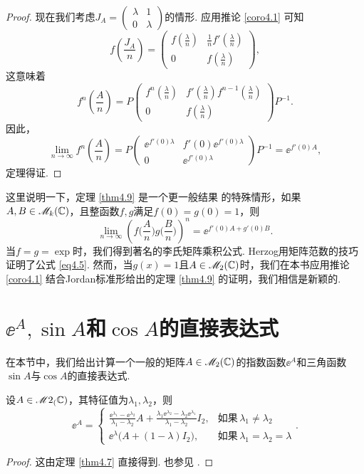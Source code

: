 \begin{proof}
  现在我们考虑$J_A=\begin{pmatrix}
    \lambda & 1 \\
    0 & \lambda
  \end{pmatrix}$的情形. 应用推论 \ref{coro4.1} 可知
  \[
    f\left(\frac{J_A}n\right) = \begin{pmatrix}
      f\left(\frac\lambda n\right) & \frac1nf'\left(\frac\lambda n\right) \\
      0 & f\left(\frac\lambda n\right)
    \end{pmatrix},
  \]
  这意味着
  \[
    f^n\left(\frac An\right) = P\begin{pmatrix}
      f^n\left(\frac\lambda n\right) & f'\left(\frac\lambda n\right) f^{n-1}\left(\frac\lambda n\right) \\
      0 & f\left(\frac\lambda n\right)
    \end{pmatrix}P^{-1}.
  \]
  因此，
  \[
    \lim_{n\to\infty}f^n\left(\frac An\right) = P\begin{pmatrix}
      \ee^{f'(0)\lambda} & f'(0)\ee^{f'(0)\lambda} \\
      0 & \ee^{f'(0)\lambda}
    \end{pmatrix}P^{-1} = \ee^{f'(0)A},
  \]
  定理得证.
\end{proof}

\begin{remark}
  这里说明一下，定理 \ref{thm4.9} 是一个更一般结果 \cite{37} 的特殊情形，如果$A,B\in\mathscr M_k(\mathbb C)$，且整函数$f,g$满足$f(0)=g(0)=1$，则
  \begin{equation}\label{eq4.5}
    \lim_{n\to\infty} \left( f\Big( \frac An\Big) g\Big(\frac Bn\Big) \right)^n = \ee^{f'(0)A+g'(0)B}.
  \end{equation}
  当$f=g=\exp$时，我们得到著名的{\kaishu 李氏矩阵乘积公式}. Herzog用矩阵范数的技巧证明了公式 \eqref{eq4.5}. 然而，当$g(x)=1$且$A\in\mathscr M_2(\mathbb C)$时，我们在本书应用推论 \ref{coro4.1} 结合Jordan标准形给出的定理 \ref{thm4.9} 的证明，我们相信是新颖的.
\end{remark}

\section{$\ee^A,\sin A$和$\cos A$的直接表达式}
在本节中，我们给出计算一个一般的矩阵$A\in\mathscr M_2(\mathbb C)$的指数函数$\ee^A$和三角函数$\sin A$与$\cos A$的直接表达式.

\begin{theorem}
  设$A\in\mathscr M2_(\mathbb C)$，其特征值为$\lambda_1,\lambda_2$，则
  \[
    \ee^A = \begin{cases}
      \frac{\ee^{\lambda_1} - \ee^{\lambda_2}}{\lambda_1-\lambda_2} A + \frac{\lambda_1\ee^{\lambda_2}-\lambda_2
      \ee^{\lambda_1}}{\lambda_1-\lambda_2}I_2, & \text{如果}\,\lambda_1 \ne \lambda_2 \\
      \ee^\lambda\big( A+(1-\lambda)I_2 \big), & \text{如果}\, \lambda_1=\lambda_2=\lambda
    \end{cases}.
  \]
\end{theorem}
\begin{proof}
  这由定理 \ref{thm4.7} 直接得到. 也参见 \cite[Theorem 2.2, p.1228]{10}.
\end{proof}

